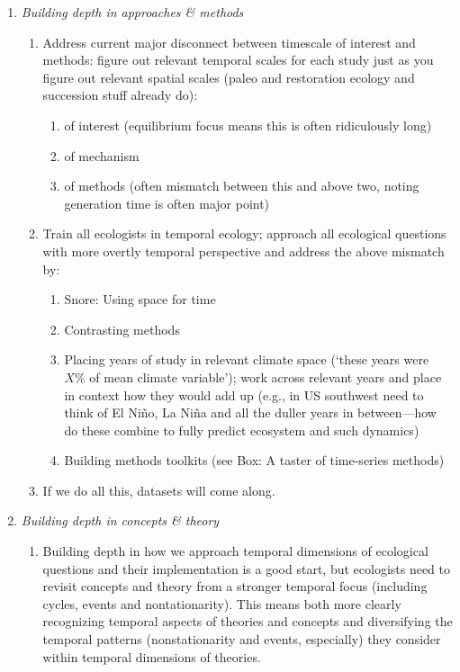 \documentclass[11pt,a4paper]{article}
\begin{document}
\begin{enumerate}
\item \emph{Building depth in approaches \& methods} 
\begin{enumerate}
\item Address current major disconnect between timescale of interest and methods: figure out relevant temporal scales for each study just as you figure out relevant spatial scales (paleo and restoration ecology and succession stuff already do):
\begin{enumerate}
\item of interest (equilibrium focus means this is often ridiculously long)
\item of mechanism
\item of methods (often mismatch between this and above two, noting generation time is often major point)
\end{enumerate}
\item Train all ecologists in temporal ecology; approach all ecological questions with more overtly temporal perspective and address the above mismatch by:
\begin{enumerate}
\item Snore: Using space for time
\item Contrasting methods
\item Placing years of study in relevant climate space (`these years were \(X\%\) of mean climate variable'); work across relevant years and place in context how they would add up (e.g., in US southwest need to think of El Ni\~no, La Ni\~na and all the duller years in between---how do these combine to fully predict ecosystem and such dynamics) 
\item Building methods toolkits (see Box: A taster of time-series methods)
\end{enumerate}
\item If we do all this, datasets will come along. 
\end{enumerate}
\item \emph{Building depth in concepts \& theory} 
\begin{enumerate}
\item Building depth in how we approach temporal dimensions of ecological questions and their implementation is a good start, but ecologists need to revisit concepts and theory from a stronger temporal focus (including cycles, events and nontationarity). This means both more clearly recognizing temporal aspects of theories and concepts and diversifying the temporal patterns (nonstationarity and events, especially) they consider within temporal dimensions of theories.

\end{enumerate}
\end{enumerate}
\end{document}
